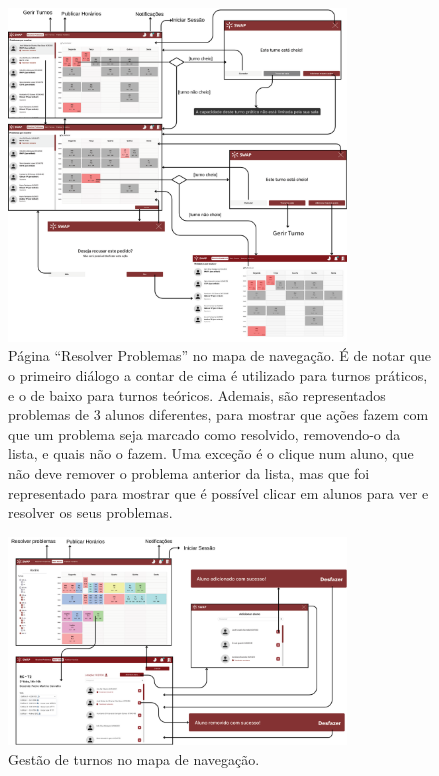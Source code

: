 \documentclass[12pt, a4paper]{article}
\begin{document}
\begin{figure}[H]
    \centering
    \includegraphics[width=0.8\textwidth]{res/navigation/6.png}
    \caption{
        \onehalfspacing
        Página ``Resolver Problemas'' no mapa de navegação. É de notar que o primeiro diálogo a
        contar de cima é utilizado para turnos práticos, e o de baixo para turnos teóricos.
        Ademais, são representados problemas de 3 alunos diferentes, para mostrar que ações fazem
        com que um problema seja marcado como resolvido, removendo-o da lista, e quais não o fazem.
        Uma exceção é o clique num aluno, que não deve remover o problema anterior da lista, mas
        que foi representado para mostrar que é possível clicar em alunos para ver e resolver os
        seus problemas.
    }
    \label{navigation-6}
\end{figure}

\begin{figure}[H]
    \centering
    \includegraphics[width=0.8\textwidth]{res/navigation/7.png}
    \caption{Gestão de turnos no mapa de navegação.}
    \label{navigation-7}
\end{figure}
\end{document}
